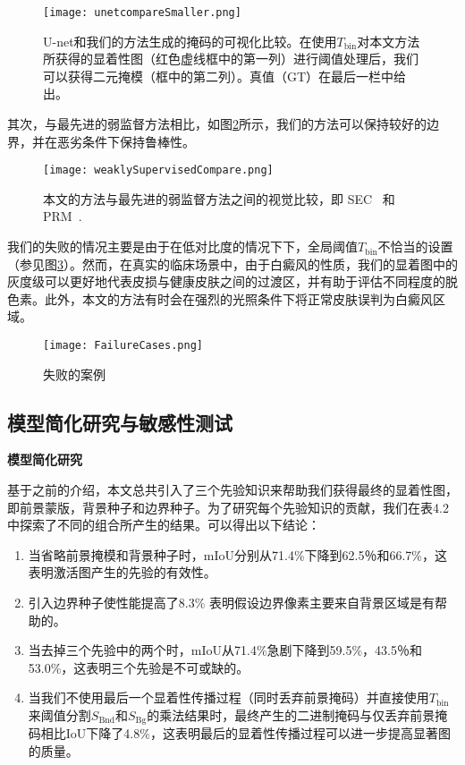 \begin{figure}[htbp]
\begin{center}
\texttt{[image: unetcompareSmaller.png]}
\end{center}
   \caption{U-net和我们的方法生成的掩码的可视化比较。在使用$ {T_ \mathrm {bin}} $对本文方法所获得的显着性图（红色虚线框中的第一列）进行阈值处理后，我们可以获得二元掩模（框中的第二列）。真值（GT）在最后一栏中给出。}
\label{fig:unetResult}
\end{figure}

其次，与最先进的弱监督方法相比，如图\ref {fig:weaklySupervisedCompare}所示，我们的方法可以保持较好的边界，并在恶劣条件下保持鲁棒性。

\begin{figure}[h]
\begin{center}
\texttt{[image: weaklySupervisedCompare.png]}
\end{center}
   \caption{本文的方法与最先进的弱监督方法之间的视觉比较，即 SEC~\cite{Kolesnikov:2016tf} 和 PRM~\cite{Zhou:2018ul}. }\vspace{-3mm}
\label{fig:weaklySupervisedCompare}
\end{figure}

我们的失败的情况主要是由于在低对比度的情况下下，全局阈值$ {T_ \mathrm {bin}} $不恰当的设置（参见图\ref {fig:FailureCases}）。然而，在真实的临床场景中，由于白癜风的性质，我们的显着图中的灰度级可以更好地代表皮损与健康皮肤之间的过渡区，并有助于评估不同程度的脱色素。此外，本文的方法有时会在强烈的光照条件下将正常皮肤误判为白癜风区域。

\begin{figure}[h]
\begin{center}
\texttt{[image: FailureCases.png]}
\end{center}
   \caption{失败的案例}
\label{fig:FailureCases}
\end{figure}

\subsection{模型简化研究与敏感性测试}
\textbf{模型简化研究}


基于之前的介绍，本文总共引入了三个先验知识来帮助我们获得最终的显着性图，即前景蒙版，背景种子和边界种子。为了研究每个先验知识的贡献，我们在表4.2中探索了不同的组合所产生的结果。可以得出以下结论：

\begin{enumerate}
\item 当省略前景掩模和背景种子时，mIoU分别从71.4\%下降到62.5％和66.7\%，这表明激活图产生的先验的有效性。
\item 引入边界种子使性能提高了8.3\% 表明假设边界像素主要来自背景区域是有帮助的。
\item 当去掉三个先验中的两个时，mIoU从71.4\%急剧下降到59.5\%，43.5％和53.0\%，这表明三个先验是不可或缺的。
\item 当我们不使用最后一个显着性传播过程（同时丢弃前景掩码）并直接使用$ {T_ \mathrm {bin}} $来阈值分割$ S_\mathrm {Bnd} $和$ S_ \mathrm {Bg} $的乘法结果时，最终产生的二进制掩码与仅丢弃前景掩码相比IoU下降了4.8\%，这表明最后的显着性传播过程可以进一步提高显著图的质量。
\end{enumerate}

